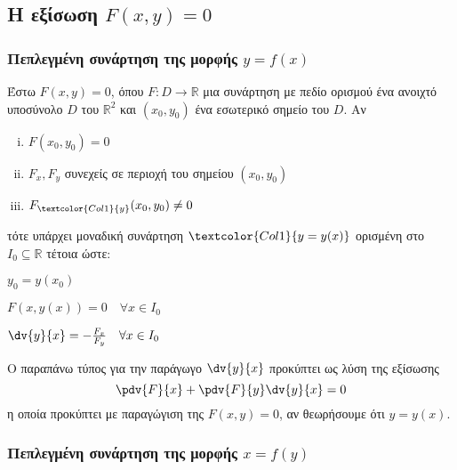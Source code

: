     \vspace{\baselineskip}

    \subsection{Η εξίσωση \ensuremath{F(x,y) = 0}}

    \subsubsection{Πεπλεγμένη συνάρτηση της μορφής \ensuremath{y=f(x)}}

    Έστω $ F(x,y) = 0 $, όπου $ F\colon D \to \mathbb{R} $ μια συνάρτηση με πεδίο
    ορισμού ένα ανοιχτό υποσύνολο $D$ του $\mathbb{R}^{2}$ και $ (x_0,y_0) $ ένα 
    εσωτερικό σημείο του $D$.  Αν 
    \begin{enumerate}[(i)]
      \item $F(x_0,y_0) = 0$ 
      \item $ F_x, F_y$ συνεχείς σε περιοχή του σημείου $ (x_0,y_0) $ 
      \item $ F_{\textcolor{Col1}{y}}(x_0,y_0) \neq 0 $
    \end{enumerate}
    τότε υπάρχει μοναδική συνάρτηση $\textcolor{Col1}{y=y(x)} $ ορισμένη στο $ I_0 \subseteq \mathbb{R} $ 
    τέτοια ώστε:
    \begin{myitemize}
      \item $y_0 = y(x_0)$
      \item $F(x,y(x)) = 0 \quad \forall x \in I_0$
      \item $ \dv{y}{x} = - \frac{F_x}{F_y} \quad \forall x \in I_0  $
    \end{myitemize}

    \begin{rem}
      Ο παραπάνω τύπος για την παράγωγο $ \dv{y}{x} $ προκύπτει ως λύση της εξίσωσης
      \[
        \pdv{F}{x} + \pdv{F}{y}\dv{y}{x} = 0 
      \] 
      η οποία προκύπτει με παραγώγιση της $ F(x,y) = 0$, αν θεωρήσουμε ότι $ y=y(x) $.
    \end{rem}

    \subsubsection{Πεπλεγμένη συνάρτηση της μορφής \ensuremath{x=f(y)}}

